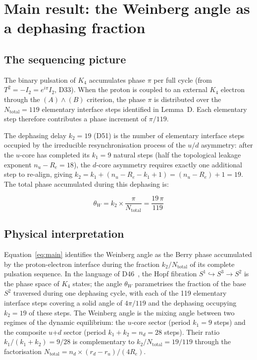 \documentclass[12pt,a4paper]{article}
\theoremstyle{plain}
\theoremstyle{definition}
\theoremstyle{remark}
\newcommand{\Kfour}{K_4}
\renewcommand{\Re}{R_e}
\newcommand{\ru}{r_u}
\newcommand{\rd}{r_d}
\newcommand{\thetaW}{\theta_W}
\newcommand{\Ntot}{N_{\mathrm{total}}}
\newcommand{\kone}{k_1}
\newcommand{\ktwo}{k_2}
\begin{document}
\section{Main result: the Weinberg angle as a dephasing fraction}
\label{sec:main}

\subsection{The sequencing picture}

The binary pulsation of $\Kfour$ accumulates phase $\pi$ per full cycle (from $T^2 = -I_2 = e^{i\pi}I_2$, D33). When the proton is coupled to an external $\Kfour$ electron through the $(A)\wedge(B)$ criterion, the phase $\pi$ is distributed over the $\Ntot = 119$ elementary interface steps identified in Lemma~D. Each elementary step therefore contributes a phase increment of $\pi/119$.

The dephasing delay $\ktwo = 19$ (D51) is the number of elementary interface steps occupied by the irreducible resynchronisation process of the $u/d$ asymmetry: after the $u$-core has completed its $\kone = 9$ natural steps (half the topological leakage exponent $n_u - \Re = 18$), the $d$-core asymmetry requires exactly one additional step to re-align, giving $\ktwo = \kone + (n_u - \Re - \kone + 1) = (n_u - \Re) + 1 = 19$. The total phase accumulated during this dephasing is:

\begin{equation}
\boxed{\thetaW = \ktwo \times \frac{\pi}{\Ntot} = \frac{19\,\pi}{119}}
\label{eq:main}
\end{equation}

\subsection{Physical interpretation}

Equation~\eqref{eq:main} identifies the Weinberg angle as the Berry phase accumulated by the proton-electron interface during the fraction $\ktwo/\Ntot$ of its complete pulsation sequence. In the language of D46~\cite{PDL_D46}, the Hopf fibration $S^1 \hookrightarrow S^3 \to S^2$ is the phase space of $\Kfour$ states; the angle $\thetaW$ parametrises the fraction of the base $S^2$ traversed during one dephasing cycle, with each of the 119 elementary interface steps covering a solid angle of $4\pi/119$ and the dephasing occupying $k_2 = 19$ of these steps. The Weinberg angle is the mixing angle between two regimes of the dynamic equilibrium: the $u$-core sector (period $\kone = 9$ steps) and the composite $u$+$d$ sector (period $\kone + \ktwo = n_d = 28$ steps). Their ratio $\kone/(\kone+\ktwo) = 9/28$ is complementary to $\ktwo/\Ntot = 19/119$ through the factorisation $\Ntot = n_d \times (\rd-\ru)/(4\Re)$.
\end{document}
